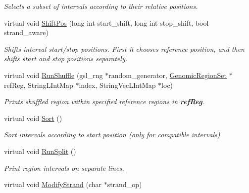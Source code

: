 \begin{DoxyCompactItemize}
\begin{DoxyCompactList}\small\item\em Selects a subset of intervals according to their relative positions. \end{DoxyCompactList}\item 
virtual void \hyperlink{classGenomicRegion_a0ee8c165839c79afdc586f8b5e07788e}{ShiftPos} (long int start\_\-shift, long int stop\_\-shift, bool strand\_\-aware)
\begin{DoxyCompactList}\small\item\em Shifts interval start/stop positions. First it chooses reference position, and then shifts start and stop positions separately. \end{DoxyCompactList}\item 
\hypertarget{classGenomicRegion_ab2c52ae40b34f3607f4558add94c25fd}{
virtual void \hyperlink{classGenomicRegion_ab2c52ae40b34f3607f4558add94c25fd}{RunShuffle} (gsl\_\-rng $\ast$random\_\-generator, \hyperlink{classGenomicRegionSet}{GenomicRegionSet} $\ast$refReg, StringLIntMap $\ast$index, StringVecLIntMap $\ast$loc)}
\label{classGenomicRegion_ab2c52ae40b34f3607f4558add94c25fd}

\begin{DoxyCompactList}\small\item\em Prints shuffled region within specified reference regions in {\bfseries refReg}. \end{DoxyCompactList}\item 
\hypertarget{classGenomicRegion_a03959dc5b5695d817b5a40b47f30a4aa}{
virtual void \hyperlink{classGenomicRegion_a03959dc5b5695d817b5a40b47f30a4aa}{Sort} ()}
\label{classGenomicRegion_a03959dc5b5695d817b5a40b47f30a4aa}

\begin{DoxyCompactList}\small\item\em Sort intervals according to start position (only for compatible intervals) \end{DoxyCompactList}\item 
\hypertarget{classGenomicRegion_a1686d4f4d2962b22d506a25a5887c31c}{
virtual void \hyperlink{classGenomicRegion_a1686d4f4d2962b22d506a25a5887c31c}{RunSplit} ()}
\label{classGenomicRegion_a1686d4f4d2962b22d506a25a5887c31c}

\begin{DoxyCompactList}\small\item\em Print region intervals on separate lines. \end{DoxyCompactList}\item 
\hypertarget{classGenomicRegion_ae19cd6eaa883e6517ba12567cd756320}{
virtual void \hyperlink{classGenomicRegion_ae19cd6eaa883e6517ba12567cd756320}{ModifyStrand} (char $\ast$strand\_\-op)}
\label{classGenomicRegion_ae19cd6eaa883e6517ba12567cd756320}


\end{DoxyCompactItemize}
